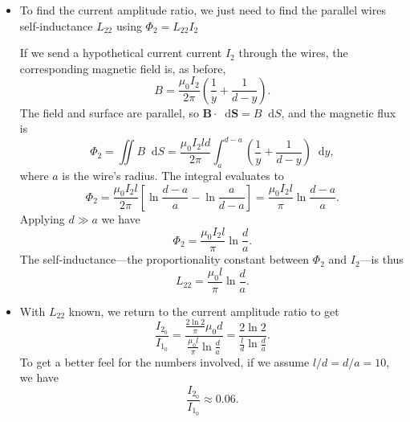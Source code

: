 \documentclass[11pt, a4paper]{article}
\newcommand{\diff}{\mathop{}\!\mathrm{d}} %
\renewcommand{\vec}[1]{\bm{#1}} %
\newcommand{\mm}{\mu_{0}}  %
\newcommand{\m}{\vec{m}}  %
\begin{document}
\begin{itemize}
	\item To find the current amplitude ratio, we just need to find the parallel wires self-inductance $ L_{22} $ using $ \Phi_{2} = L_{22}I_{2} $
	
	If we send a hypothetical current current $ I_{2} $ through the wires, the corresponding magnetic field is, as before,
	\begin{equation*}
		B = \frac{\mm I_{2}}{2\pi} \left(\frac{1}{y} + \frac{1}{d-y}\right) .
	\end{equation*}
	The field and surface are parallel, so $ \vec{B} \cdot \diff \vec{S} = B \diff S $, and the magnetic flux is
	\begin{equation*}
		\Phi_{2} = \iint B \diff S = \frac{\mm I_{2} l d}{2 \pi}\int_{a}^{d-a}\left(\frac{1}{y} + \frac{1}{d-y}\right)\diff y,
	\end{equation*}
	where $ a $ is the wire's radius. The integral evaluates to
	\begin{equation*}
		\Phi_{2} = \frac{\mm I_{2} l}{2 \pi}\left[\ln \frac{d-a}{a} - \ln \frac{a}{d-a}\right] = \frac{\mm I_{2} l}{\pi} \ln \frac{d-a}{a}.
	\end{equation*}
	Applying $ d \gg a $ we have
	\begin{equation*}
		\Phi_{2} = \frac{\mm I_{2} l}{\pi} \ln \frac{d}{a}.
	\end{equation*}
	The self-inductance---the proportionality constant between $ \Phi_{2} $ and $ I_{2} $---is thus
	\begin{equation*}
		L_{22} = \frac{\mm l}{\pi}\ln \frac{d}{a}.
	\end{equation*}
	
	\item With $ L_{22} $ known, we return to the current amplitude ratio to get
	\begin{equation*}
		\frac{I_{2_{0}}}{I_{1_{0}}} = \frac{\frac{2\ln 2}{\pi} \mm d}{\frac{\mm l}{\pi}\ln \frac{d}{a}} = \frac{2\ln 2}{\frac{l}{d} \ln \frac{d}{a}}.
	\end{equation*}
	To get a better feel for the numbers involved, if we assume $ l/d = d/a = 10 $, we have 
	\begin{equation*}
		\frac{I_{2_{0}}}{I_{1_{0}}} \approx 0.06.
	\end{equation*}
\end{itemize}
\end{document}
